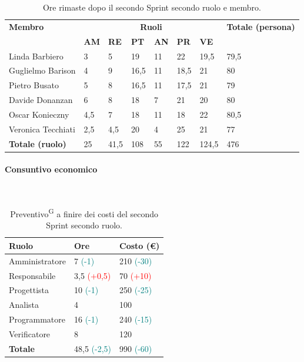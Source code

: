 \documentclass[8pt]{article}
\newcommand{\glossterm}[1]{#1\textsuperscript{G}} %
\newcommand{\subsubsubsection}[1]{\paragraph{#1}\mbox{}\\}
\begin{document}
\begin{table}[ht!]
	\centering
	\begin{tabular}{p{4cm} p{1cm} p{1cm} p{1cm} p{1cm} p{1cm} p{1cm} p{3cm}}
		\toprule
        \textbf{Membro} & \multicolumn{6}{c}{\textbf{Ruoli}} & \textbf{Totale (persona)}\\
		& \textbf{AM} & \textbf{RE} & \textbf{PT} & \textbf{AN} & \textbf{PR} & \textbf{VE}\\
		\midrule
        Linda Barbiero          & 3     & 5     & 19     & 11   & 22     & 19,5   & 79,5 \\
        Guglielmo Barison       & 4     & 9     & 16,5     & 11   & 18,5   & 21     & 80\\
        Pietro Busato           & 5     & 8     & 16,5     & 11   & 17,5   & 21     & 79\\
        Davide Donanzan         & 6     & 8     & 18     & 7    & 21     & 20     & 80\\
        Oscar Konieczny         & 4,5   & 7     & 18     & 11   & 18     & 22     & 80,5\\
        Veronica Tecchiati      & 2,5   & 4,5     & 20     & 4    & 25     & 21     & 77\\
        \bottomrule
        \textbf{Totale (ruolo)} & 25    & 41,5    & 108    & 55   & 122     & 124,5 & 476 \\
	\end{tabular}
	\caption{Ore rimaste dopo il secondo Sprint secondo ruolo e membro.}
	\label{table:Ore rimaste dopo il secondo Sprint secondo ruolo e membro}
\end{table}
\subsubsubsection{Consuntivo economico}
\begin{table}[ht!]
	\centering
	\begin{tabular}{p{4cm} p{2cm} p{2cm}}
        \toprule
        \textbf{Ruolo} & \textbf{Ore} & \textbf{Costo (€)} \\
        \midrule
        Amministratore & 7 \textcolor{teal}{(-1)} & 210 \textcolor{teal}{(-30)}\\
        Responsabile & 3,5 \textcolor{red}{(+0,5)} & 70 \textcolor{red}{(+10)} \\
        Progettista & 10 \textcolor{teal}{(-1)} & 250 \textcolor{teal}{(-25)} \\
        Analista & 4 & 100 \\
        Programmatore & 16 \textcolor{teal}{(-1)} & 240 \textcolor{teal}{(-15)} \\
        Verificatore & 8 & 120 \\
        \bottomrule
        \textbf{Totale} & 48,5 \textcolor{teal}{(-2,5)} & 990 \textcolor{teal}{(-60)}
    \end{tabular}
    \caption{\glossterm{Preventivo} a finire dei costi del secondo Sprint secondo ruolo.}
	\label{table:Preventivo a finire dei costi del secondo Sprint secondo ruolo}
\end{table}
\end{document}
